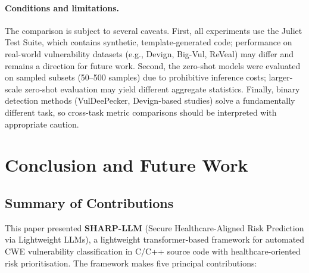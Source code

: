 \documentclass[conference]{IEEEtran}
\begin{document}
\paragraph{Conditions and limitations.}
The comparison is subject to several caveats.  First, all experiments
use the Juliet Test Suite, which contains synthetic, template-generated
code; performance on real-world vulnerability datasets (e.g., Devign,
Big-Vul, ReVeal) may differ and remains a direction for future work.
Second, the zero-shot models were evaluated on sampled subsets (50--500
samples) due to prohibitive inference costs; larger-scale zero-shot
evaluation may yield different aggregate statistics.
Finally, binary detection methods (VulDeePecker, Devign-based studies)
solve a fundamentally different task, so cross-task metric comparisons
should be interpreted with appropriate caution.


\section{Conclusion and Future Work}
\label{sec:conclusion}

\subsection{Summary of Contributions}
\label{sec:contributions}

This paper presented \textbf{SHARP-LLM} (Secure Healthcare-Aligned Risk
Prediction via Lightweight LLMs), a lightweight transformer-based framework
for automated CWE vulnerability classification in C/C++ source code with
healthcare-oriented risk prioritisation.  The framework makes five principal
contributions:
\end{document}

